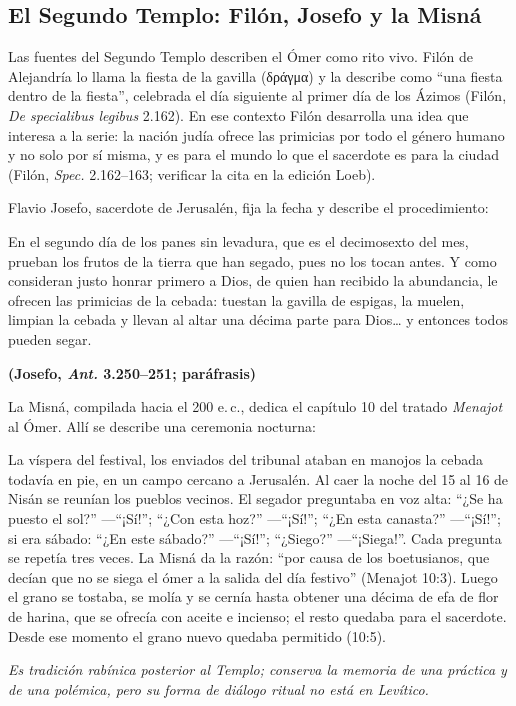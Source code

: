 \documentclass[11pt,letterpaper]{article}
\newcommand{\grc}[1]{\foreignlanguage{ancientgreek}{#1}}
\newcommand{\fuente}[1]{\par\hfill{\upshape\bfseries\small\textcolor{tierraroja}{#1}}}
\begin{document}
\subsection{El Segundo Templo: Filón, Josefo y la Misná}
Las fuentes del Segundo Templo describen el Ómer como rito vivo. Filón de Alejandría lo llama la fiesta de la gavilla (\grc{δράγμα}) y la describe como ``una fiesta dentro de la fiesta'', celebrada el día siguiente al primer día de los Ázimos (Filón, \emph{De specialibus legibus} 2.162). En ese contexto Filón desarrolla una idea que interesa a la serie: la nación judía ofrece las primicias por todo el género humano y no solo por sí misma, y es para el mundo lo que el sacerdote es para la ciudad (Filón, \emph{Spec.} 2.162--163; verificar la cita en la edición Loeb).

Flavio Josefo, sacerdote de Jerusalén, fija la fecha y describe el procedimiento:

\begin{cita}En el segundo día de los panes sin levadura, que es el decimosexto del mes, prueban los frutos de la tierra que han segado, pues no los tocan antes. Y como consideran justo honrar primero a Dios, de quien han recibido la abundancia, le ofrecen las primicias de la cebada: tuestan la gavilla de espigas, la muelen, limpian la cebada y llevan al altar una décima parte para Dios\ldots{} y entonces todos pueden segar.\fuente{(Josefo, \emph{Ant.} 3.250--251; paráfrasis)}\end{cita}

La Misná, compilada hacia el 200 e.\,c., dedica el capítulo 10 del tratado \emph{Menajot} al Ómer. Allí se describe una ceremonia nocturna:

\begin{nota}
La víspera del festival, los enviados del tribunal ataban en manojos la cebada todavía en pie, en un campo cercano a Jerusalén. Al caer la noche del 15 al 16 de Nisán se reunían los pueblos vecinos. El segador preguntaba en voz alta: ``¿Se ha puesto el sol?'' ---``¡Sí!''; ``¿Con esta hoz?'' ---``¡Sí!''; ``¿En esta canasta?'' ---``¡Sí!''; si era sábado: ``¿En este sábado?'' ---``¡Sí!''; ``¿Siego?'' ---``¡Siega!''. Cada pregunta se repetía tres veces. La Misná da la razón: ``por causa de los boetusianos, que decían que no se siega el ómer a la salida del día festivo'' (Menajot 10:3). Luego el grano se tostaba, se molía y se cernía hasta obtener una décima de efa de flor de harina, que se ofrecía con aceite e incienso; el resto quedaba para el sacerdote. Desde ese momento el grano nuevo quedaba permitido (10:5).
\par\smallskip\emph{Es tradición rabínica posterior al Templo; conserva la memoria de una práctica y de una polémica, pero su forma de diálogo ritual no está en Levítico.}
\end{nota}
\end{document}
